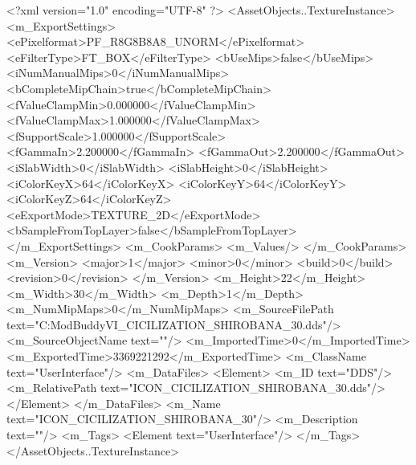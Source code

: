 <?xml version="1.0" encoding="UTF-8" ?>
<AssetObjects..TextureInstance>
	<m_ExportSettings>
		<ePixelformat>PF_R8G8B8A8_UNORM</ePixelformat>
		<eFilterType>FT_BOX</eFilterType>
		<bUseMips>false</bUseMips>
		<iNumManualMips>0</iNumManualMips>
		<bCompleteMipChain>true</bCompleteMipChain>
		<fValueClampMin>0.000000</fValueClampMin>
		<fValueClampMax>1.000000</fValueClampMax>
		<fSupportScale>1.000000</fSupportScale>
		<fGammaIn>2.200000</fGammaIn>
		<fGammaOut>2.200000</fGammaOut>
		<iSlabWidth>0</iSlabWidth>
		<iSlabHeight>0</iSlabHeight>
		<iColorKeyX>64</iColorKeyX>
		<iColorKeyY>64</iColorKeyY>
		<iColorKeyZ>64</iColorKeyZ>
		<eExportMode>TEXTURE_2D</eExportMode>
		<bSampleFromTopLayer>false</bSampleFromTopLayer>
	</m_ExportSettings>
	<m_CookParams>
		<m_Values/>
	</m_CookParams>
	<m_Version>
		<major>1</major>
		<minor>0</minor>
		<build>0</build>
		<revision>0</revision>
	</m_Version>
	<m_Height>22</m_Height>
	<m_Width>30</m_Width>
	<m_Depth>1</m_Depth>
	<m_NumMipMaps>0</m_NumMipMaps>
	<m_SourceFilePath text="C:\Users\asus\Documents\Firaxis ModBuddy\Civilization VI\temppic\ICON_CICILIZATION_SHIROBANA_30.dds"/>
	<m_SourceObjectName text=""/>
	<m_ImportedTime>0</m_ImportedTime>
	<m_ExportedTime>3369221292</m_ExportedTime>
	<m_ClassName text="UserInterface"/>
	<m_DataFiles>
		<Element>
			<m_ID text="DDS"/>
			<m_RelativePath text="ICON_CICILIZATION_SHIROBANA_30.dds"/>
		</Element>
	</m_DataFiles>
	<m_Name text="ICON_CICILIZATION_SHIROBANA_30"/>
	<m_Description text=""/>
	<m_Tags>
		<Element text="UserInterface"/>
	</m_Tags>
</AssetObjects..TextureInstance>

